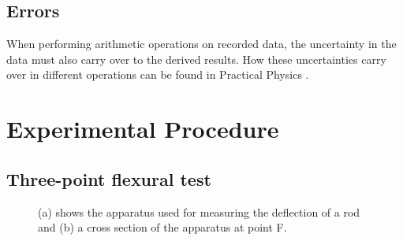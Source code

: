 \documentclass[11pt,a4paper]{article}
\begin{document}
  \subsection{Errors}
    When performing arithmetic operations on recorded data, the uncertainty in the data must also carry over to the derived results. How these uncertainties carry over in different operations can be found in Practical Physics \cite{squires}.

\section{\label{section:experimental}Experimental Procedure}
  \subsection{Three-point flexural test}

    \begin{figure}[H]
      \centering
      \center
      \caption{(a) shows the apparatus used for measuring the deflection of a rod and (b) a cross section of the  apparatus at point F.}
      \label{fig:exp_1}
    \end{figure}
\end{document}
